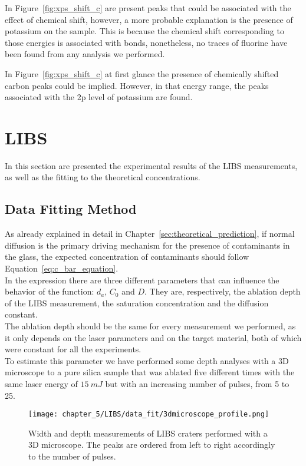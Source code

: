 In Figure~\ref{fig:xps_shift_c} are present peaks that could be associated with the effect of chemical shift, however, a more probable explanation is the presence of potassium on the sample. This is because the chemical shift corresponding to those energies is associated with  bonds, nonetheless, no traces of fluorine have been found from any analysis we performed.

In Figure~\ref{fig:xps_shift_c} at first glance the presence of chemically shifted carbon peaks could be implied. However, in that energy range, the peaks associated with the 2p level of potassium are found.
\section{LIBS}
\label{sec:LIBS_measurements}

In this section are presented the experimental results of the LIBS measurements, as well as the fitting to the theoretical concentrations.
\subsection{Data Fitting Method}
\label{subsec:data_fitting}
As already explained in detail in Chapter~\ref{sec:theoretical_prediction}, if normal diffusion is the primary driving mechanism for the presence of contaminants in the glass, the expected concentration of contaminants should follow Equation~\ref{eq:c_bar_equation}.
\\
In the expression there are three different parameters that can influence the behavior of the function: $d_a$, $C_0$ and $D$. They are, respectively, the ablation depth of the LIBS measurement, the saturation concentration and the diffusion constant.
\\
The ablation depth should be the same for every measurement we performed, as it only depends on the laser parameters and on the target material, both of which were constant for all the experiments.
\\
To estimate this parameter we have performed some depth analyses with a 3D microscope to a pure silica sample that was ablated five different times with the same laser energy of $15 \: mJ$ but with an increasing number of pulses, from 5 to 25.

\begin{figure}[H]
    \centering
    \texttt{[image: chapter\_5/LIBS/data\_fit/3dmicroscope\_profile.png]} 
    \caption{Width and depth measurements of LIBS craters performed with a 3D microscope. The peaks are ordered from left to right accordingly to the number of pulses.}
    \label{fig:3d_microscope_craters}
 \end{figure}


